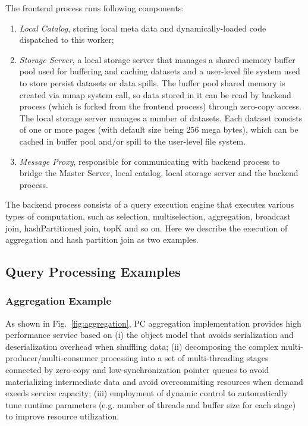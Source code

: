 The frontend process runs following components:

\begin{enumerate}
\item \emph{Local Catalog}, storing local meta data and dynamically-loaded code dispatched to this worker;
\item \emph{Storage Server}, a local storage server that manages a shared-memory buffer pool used for buffering and caching datasets and a user-level file system used to store persist datasets or data spills. The buffer pool shared memory is created via mmap system call, so data stored in it can be read by backend process (which is forked from the frontend process) through zero-copy access. The local storage server manages a number of datasets. Each dataset consists of one or more pages (with default size being 256 mega bytes), which can be cached in buffer pool and/or spill to the user-level file system.
\item \emph{Message Proxy},  responsible for communicating with backend process to bridge the Master Server, local catalog, local storage server and the backend process.

\end{enumerate}

The backend process consists of a query execution engine that executes various types of computation, such as selection, multiselection, aggregation, broadcast join, hashPartitioned join, topK and so on. Here we describe the execution of aggregation and hash partition join as two examples.


\subsection{Query Processing Examples}
\subsubsection{Aggregation Example}
As shown in Fig.~\ref{fig:aggregation},  PC aggregation implementation provides high performance service based on (i) the object model that avoids serialization and deserialization overhead when shuffling data; (ii) decomposing the complex multi-producer/multi-consumer processing into a set of multi-threading stages connected by zero-copy and low-synchronization pointer queues to avoid materializing intermediate data and avoid overcommiting resources when demand exeeds service capacity; (iii) employment of dynamic control to automatically tune runtime parameters (e.g. number of threads and buffer size for each stage) to improve resource utilization. 

